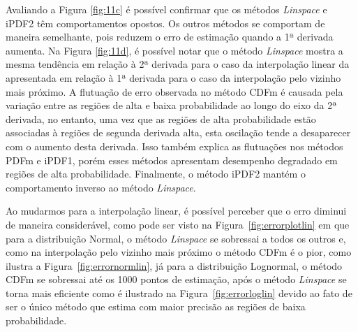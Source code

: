 Avaliando a Figura \ref{fig:11c} é possível confirmar que os métodos \textit{Linspace} e \ac{iPDF2} têm comportamentos opostos. Os outros métodos se comportam de maneira semelhante, pois reduzem o erro de estimação quando a 1ª derivada aumenta.
Na Figura \ref{fig:11d}, é possível notar que o método \textit{Linspace} mostra a mesma tendência em relação à 2ª derivada para o caso da interpolação linear da apresentada em relação à 1ª derivada para o caso da interpolação pelo vizinho mais próximo.
A flutuação de erro observada no método \ac{CDFm} é causada pela variação entre as regiões de alta e baixa probabilidade ao longo do eixo da 2ª derivada, no entanto, uma vez que as regiões de alta probabilidade estão associadas à regiões de segunda derivada alta, esta oscilação tende a desaparecer com o aumento desta derivada.
Isso também explica as flutuações nos métodos \ac{PDFm} e \ac{iPDF1}, porém esses métodos apresentam desempenho degradado em regiões de alta probabilidade. Finalmente, o método \ac{iPDF2} mantém o comportamento inverso ao método \textit{Linspace}.

Ao mudarmos para a interpolação linear, é possível perceber que o erro diminui de maneira considerável, como pode ser visto na Figura~\ref{fig:errorplotlin} em que para a distribuição Normal, o método \textit{Linspace} se sobressai a todos os outros e, como na interpolação pelo vizinho mais próximo o método \ac{CDFm} é o pior, como ilustra a Figura~\ref{fig:errornormlin}, já para a distribuição Lognormal, o método \ac{CDFm} se sobressai até os 1000 pontos de estimação, após o método \textit{Linspace} se torna mais eficiente como é ilustrado na Figura~\ref{fig:errorloglin} devido ao fato de ser o único método que estima com maior precisão as regiões de baixa probabilidade.

